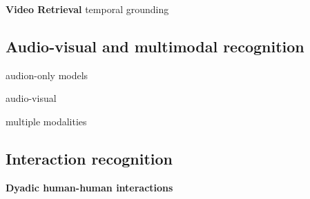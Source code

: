 \documentclass[smallextended,twocolumn,natbib]{svjour3}
\begin{document}
\noindent
\textbf{Video Retrieval} 
\citep{gordo2017beyond}
\citep{wang2016learning}
\citep{xu2015jointly}
\citep{torabi2016learning}
\citep{dong2018predicting}
\citep{otani2016learning}
\citep{kim2024you} 
\citep{wray2019fine} 
\citep{wray2021semantic}
\citep{ge2022bridging}
\citep{xue2022advancing}
\citep{gabeur2020multi}
\citep{mithun2018learning}
\citep{liu2019use}
temporal grounding 
\citep{anne2017localizing}
\citep{gao2017tall}
\citep{regneri2013grounding}
\citep{qian2024momentor} 
\citep{gu2024context}
\citep{yang2022tubedetr}
\citep{escorcia2019temporal}
\citep{flanagan2023learning}
\citep{cao2021pursuit}
\citep{chen2018temporally}
\citep{ge2019mac}
\citep{jiang2019cross}
\citep{liu2021context}
\citep{liu2018cross}
\citep{qu2020fine}
\citep{wang2020temporally}
\citep{xu2019multilevel}
\citep{chen2020rethinking}
\citep{hao2022query}
\citep{liu2022memory}
\citep{nan2021interventional}
\citep{yuan2019find}
\citep{zhang2021natural}



\subsection{Audio-visual and multimodal recognition} 

audion-only models 
\citep{baade2022mae,gong2021psla,kazakos2021slow,kong2020panns,koutini2021efficient,stergiou2023play}

audio-visual 
\citep{arandjelovic2018objects}
\citep{zhao2018sound}
\citep{gong2022uavm}
\citep{singh2024looking}
\citep{gong2023contrastive}
\citep{huang2023mavil}
\citep{pian2023audio}
\citep{guo2024crossmae}
\citep{georgescu2023audiovisual}
\citep{lin2024siamese}
\citep{nagrani2021attention}
\citep{fayek2020large}
\citep{wang2020makes}
\citep{jaegle2021perceiver}
\citep{xiao2020audiovisual}
\citep{srivastava2024omnivec2}



multiple modalities
\citep{akbari2021vatt}
\citep{kaiser2017one}
\citep{radevski2023multimodal} 
\citep{srivastava2024omnivec}
\citep{zhang2024multimodal}
\citep{munro2020multi}
\citep{recasens2023zorro}
\citep{dai2022one}
\citep{zellers2022merlot}


\subsection{Interaction recognition}

\noindent
\textbf{Dyadic human-human interactions}
\end{document}
